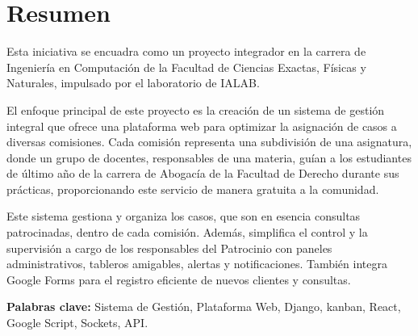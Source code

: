 \chapter*{Resumen}
Esta iniciativa se encuadra como un proyecto integrador en la carrera de Ingeniería en Computación de la Facultad de Ciencias Exactas, Físicas y Naturales, impulsado por el laboratorio de IALAB.

El enfoque principal de este proyecto es la creación de un sistema de gestión integral que ofrece una plataforma web para optimizar la asignación de casos a diversas comisiones. Cada comisión representa una subdivisión de una asignatura, donde un grupo de docentes, responsables de una materia, guían a los estudiantes de último año de la carrera de Abogacía de la Facultad de Derecho durante sus prácticas, proporcionando este servicio de manera gratuita a la comunidad.

Este sistema gestiona y organiza los casos, que son en esencia consultas patrocinadas, dentro de cada comisión. Además, simplifica el control y la supervisión a cargo de los responsables del Patrocinio con paneles administrativos, tableros amigables, alertas y notificaciones. También integra Google Forms para el registro eficiente de nuevos clientes y consultas.

\vspace{.5cm}

\textbf{Palabras clave:} Sistema de Gestión, Plataforma Web, Django, kanban, React, Google Script, Sockets, API.